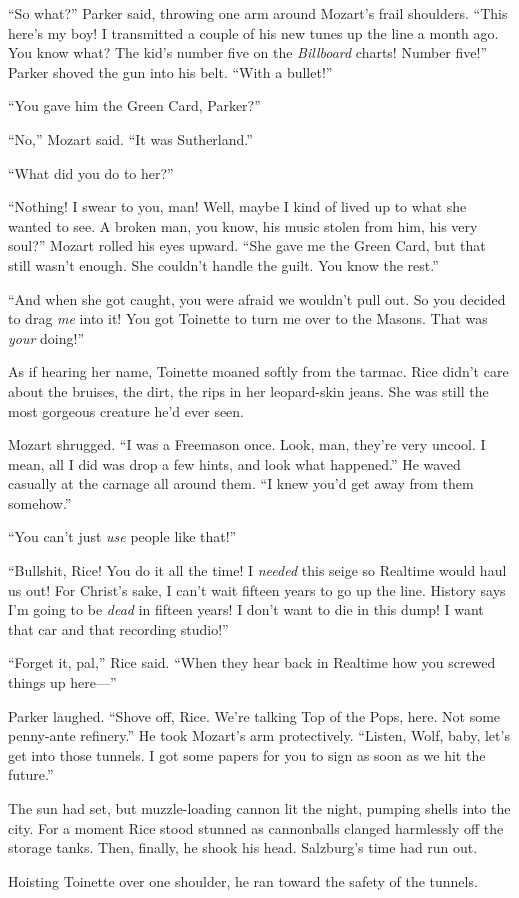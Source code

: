 ``So what?'' Parker said, throwing one arm around Mozart's frail shoulders. ``This here's my boy! I transmitted a couple of his new tunes up the line a month ago. You know what? The kid's number five on the \textit{Billboard} charts! Number five!'' Parker shoved the gun into his belt. ``With a bullet!''

``You gave him the Green Card, Parker?''

``No,'' Mozart said. ``It was Sutherland.''

``What did you do to her?''

``Nothing! I swear to you, man! Well, maybe I kind of lived up to what she wanted to see. A broken man, you know, his music stolen from him, his very soul?'' Mozart rolled his eyes upward. ``She gave me the Green Card, but that still wasn't enough. She couldn't handle the guilt. You know the rest.''

``And when she got caught, you were afraid we wouldn't pull out. So you decided to drag \textit{me} into it! You got Toinette to turn me over to the Masons. That was \textit{your} doing!''

As if hearing her name, Toinette moaned softly from the tarmac. Rice didn't care about the bruises, the dirt, the rips in her leopard-skin jeans. She was still the most gorgeous creature he'd ever seen.

Mozart shrugged. ``I was a Freemason once. Look, man, they're very uncool. I mean, all I did was drop a few hints, and look what happened.'' He waved casually at the carnage all around them. ``I knew you'd get away from them somehow.''

``You can't just \textit{use} people like that!''

``Bullshit, Rice! You do it all the time! I \textit{needed} this seige so Realtime would haul us out! For Christ's sake, I can't wait fifteen years to go up the line. History says I'm going to be \textit{dead} in fifteen years! I don't want to die in this dump! I want that car and that recording studio!''

``Forget it, pal,'' Rice said. ``When they hear back in Realtime how you screwed things up here—''

Parker laughed. ``Shove off, Rice. We're talking Top of the Pops, here. Not some penny-ante refinery.'' He took Mozart's arm protectively. ``Listen, Wolf, baby, let's get into those tunnels. I got some papers for you to sign as soon as we hit the future.''

The sun had set, but muzzle-loading cannon lit the night, pumping shells into the city. For a moment Rice stood stunned as cannonballs clanged harmlessly off the storage tanks. Then, finally, he shook his head. Salzburg's time had run out.

Hoisting Toinette over one shoulder, he ran toward the safety of the tunnels.